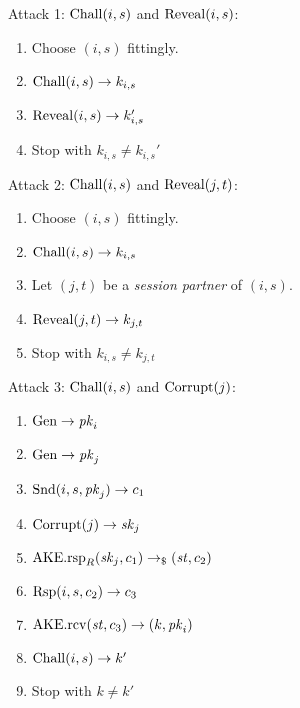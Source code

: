 \begin{minipage}[t]{.5\textwidth}
    Attack 1: $\mathrm{Chall}(i,s)$ and $\mathrm{Reveal}(i,s)$:
    \begin{enumerate}[topsep=\smallskipamount]
    \item Choose $(i,s)$ fittingly.
    \item $\mathrm{Chall}(i,s)\to k_{i,s}$
    \item $\mathrm{Reveal}(i,s)\to k_{i,s}'$
    \item Stop with $k_{i,s}\not= k_{i,s}'$
    \end{enumerate}
    \medskip
    Attack 2: $\mathrm{Chall}(i,s)$ and $\mathrm{Reveal}(j,t)$:
    \begin{enumerate}[topsep=\smallskipamount]
    \item Choose $(i,s)$ fittingly.
    \item $\mathrm{Chall}(i,s)\to k_{i,s}$
    \item Let $(j,t)$ be a \emph{session partner} of $(i,s)$.
    \item $\mathrm{Reveal}(j,t)\to k_{j,t}$
    \item Stop with $k_{i,s}\not= k_{j,t}$
    \end{enumerate}
\end{minipage}\hfill
\begin{minipage}[t]{.5\textwidth}
    Attack 3: $\mathrm{Chall}(i,s)$ and $\mathrm{Corrupt}(j)$:
    \begin{enumerate}[topsep=\smallskipamount]
    \item $\mathrm{Gen}\to\mathit{pk}_i$
    \item $\mathrm{Gen}\to\mathit{pk}_j$
    \item $\mathrm{Snd}(i,s,\mathit{pk}_j)\to c_1$
    \item $\mathrm{Corrupt}(j)\to\mathit{sk}_j$
    \item $\mathrm{AKE}.\mathrm{rsp}_R(\mathit{sk}_j,c_1)\to_\$(\mathit{st},c_2)$
    \item $\mathrm{Rsp}(i,s,c_2)\to c_3$
    \item $\mathrm{AKE}.\mathrm{rcv}(\mathit{st}, c_3)\to (k,\mathit{pk}_i)$
    \item $\mathrm{Chall}(i,s)\to k'$
    \item Stop with $k\not= k'$
    \end{enumerate}
\end{minipage}
